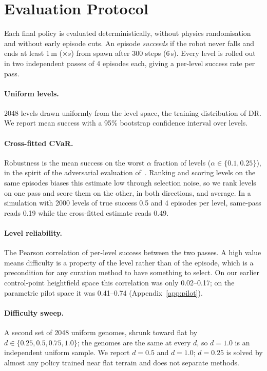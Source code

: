 \section{Evaluation Protocol}
\label{sec:protocol}

Each final policy is evaluated deterministically, without physics
randomisation and without early episode cuts. An episode \emph{succeeds}
if the robot never falls and ends at least 1\,m ($\times s$) from spawn
after 300 steps (6\,s). Every level is rolled out in two independent
passes of 4 episodes each, giving a per-level success rate per pass.

\paragraph{Uniform levels.} 2048 levels drawn uniformly from the level
space, the training distribution of DR. We report mean success with a 95\%
bootstrap confidence interval over levels.

\paragraph{Cross-fitted CVaR.} Robustness is the mean success on the worst
$\alpha$ fraction of levels ($\alpha\in\{0.1, 0.25\}$), in the spirit of
the adversarial evaluation of~\citet{rutherford2024noregrets}. Ranking and
scoring levels on the same episodes biases this estimate low through
selection noise, so we rank levels on one pass and score them on the other,
in both directions, and average. In a simulation with 2000 levels of true
success 0.5 and 4 episodes per level, same-pass  reads 0.19
while the cross-fitted estimate reads 0.49.

\paragraph{Level reliability.} The Pearson correlation of per-level success
between the two passes. A high value means difficulty is a property of the
level rather than of the episode, which is a precondition for any curation
method to have something to select. On our earlier control-point
heightfield space this correlation was only 0.02--0.17; on the parametric
pilot space it was 0.41--0.74 (Appendix~\ref{app:pilot}).

\paragraph{Difficulty sweep.} A second set of 2048 uniform genomes, shrunk
toward flat by $d\in\{0.25,0.5,0.75,1.0\}$; the genomes are the same at
every $d$, so $d=1.0$ is an independent uniform sample. We report $d=0.5$
and $d=1.0$; $d=0.25$ is solved by almost any policy trained near flat
terrain and does not separate methods.

